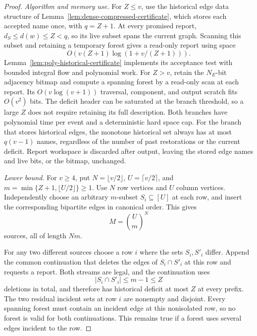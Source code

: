 \documentclass[11pt,letterpaper]{article}
\numberwithin{equation}{section}
\begin{document}
\begin{proof}
\emph{Algorithm and memory use.} For $Z\le v$, use the historical edge data structure of Lemma~\ref{lem:dense-compressed-certificate}, which stores each accepted name once, with $q=Z+1$.
At every promised report, $d_S\le d(w)\le Z<q$, so its live subset spans the current graph.
Scanning this subset and retaining a temporary forest gives a read-only report using space
\begin{equation}
 O\!\left(v(Z+1)\log(1+v/(Z+1))\right).
 \label{eq:forest-pu2}
\end{equation}
Lemma~\ref{lem:poly-historical-certificate} implements its acceptance test with bounded integral flow and polynomial work.
For $Z>v$, retain the $N_E$-bit adjacency bitmap and compute a spanning forest by a read-only scan at each report.
Its $O(v\log(v+1))$ traversal, component, and output scratch fits $O(v^2)$ bits.
The deficit header can be saturated at the branch threshold, so a large $Z$ does not require retaining its full description.
Both branches have polynomial time per event and a deterministic hard space cap.
For the branch that stores historical edges, the monotone historical set always has at most $q(v-1)$ names, regardless of the number of past restorations or the current deficit.
Report workspace is discarded after output, leaving the stored edge names and live bits, or the bitmap, unchanged.

\emph{Lower bound.} For $v\ge4$, put $N=\lfloor v/2\rfloor$, $U=\lceil v/2\rceil$, and $m=\min\{Z+1,\lfloor U/2\rfloor\}\ge1$.
Use $N$ row vertices and $U$ column vertices.
Independently choose an arbitrary $m$-subset $S_i\subseteq[U]$ at each row, and insert the corresponding bipartite edges in canonical order.
This gives
\[
 M=\binom{U}{m}^N
\]
sources, all of length $Nm$.

For any two different sources choose a row $i$ where the sets $S_i,S'_i$ differ.
Append the common continuation that deletes the edges of $S_i\cap S'_i$ at this row and requests a report.
Both streams are legal, and the continuation uses
\[
 |S_i\cap S'_i|\le m-1\le Z
\]
deletions in total, and therefore has historical deficit at most $Z$ at every prefix.
The two residual incident sets at row $i$ are nonempty and disjoint.
Every spanning forest must contain an incident edge at this nonisolated row, so no forest is valid for both continuations.
This remains true if a forest uses several edges incident to the row.


\end{proof}
\end{document}
